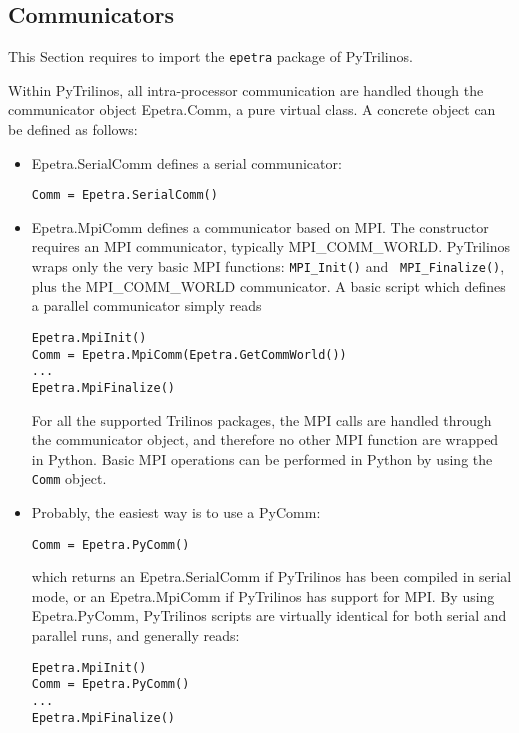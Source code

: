 \documentclass[10pt,relax]{SANDreport}
\newcommand{\PyTrilinos}{{PyTrilinos}}
\begin{document}
\subsection{Communicators}
\label{sec:communicators}

This Section requires to import the {\tt epetra} package of \PyTrilinos.

Within PyTrilinos, all intra-processor communication are handled though the
communicator object Epetra.Comm, a pure virtual class. A concrete object can
be defined as follows:
\begin{itemize}
\item Epetra.SerialComm defines a serial communicator:
\begin{verbatim}
Comm = Epetra.SerialComm()
\end{verbatim}
\item Epetra.MpiComm defines a communicator based on MPI. The constructor
requires an MPI communicator, typically MPI\_COMM\_WORLD. PyTrilinos 
wraps only the very basic MPI functions: {\tt MPI\_Init()} and {\tt
  MPI\_Finalize()}, plus the MPI\_COMM\_WORLD communicator.  A basic script
  which defines a parallel communicator simply reads
\begin{verbatim}
Epetra.MpiInit()
Comm = Epetra.MpiComm(Epetra.GetCommWorld())
...
Epetra.MpiFinalize()
\end{verbatim}
For all the supported Trilinos packages, the MPI calls are handled through 
the communicator object, and therefore no other MPI function are
wrapped in Python. Basic MPI operations can be performed in Python by using
the {\tt Comm} object.
\item Probably, the easiest way is to use a PyComm:
\begin{verbatim}
Comm = Epetra.PyComm()
\end{verbatim}
which returns an Epetra.SerialComm if PyTrilinos has been compiled in serial
mode, or an Epetra.MpiComm if PyTrilinos has support for MPI. By using
Epetra.PyComm, PyTrilinos scripts are virtually identical for both serial and
parallel runs, and generally reads:
\begin{verbatim}
Epetra.MpiInit()
Comm = Epetra.PyComm()
...
Epetra.MpiFinalize()
\end{verbatim}
\end{itemize}

\end{document}
